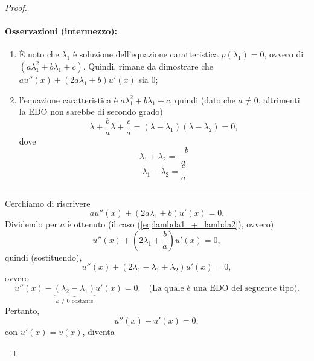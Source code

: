 \begin{proof}
\begin{enumerate}
		\paragraph{Osservazioni (intermezzo):}
		\begin{enumerate}
			\item È noto che $\lambda_1$ è soluzione dell'equazione caratteristica $p(\lambda_1)=0$, ovvero di $(a\lambda_1^2+b\lambda_1 +c)$. Quindi, rimane da dimostrare che $a u''(x)+(2a\lambda_1 + b)u'(x)$ sia 0;
			\item l'equazione caratteristica è $a\lambda_1^2+b\lambda_1 +c$, quindi (dato che $a\neq0$, altrimenti la EDO non sarebbe di secondo grado)
			\begin{equation*}
				\lambda + \frac{b}{a} \lambda + \frac{c}{a}= (\lambda - \lambda_1)(\lambda - \lambda_2) = 0,
			\end{equation*}
			dove
			\begin{equation}\label{eq:lambda1_+_lambda2}
				\lambda_1 + \lambda_2 = \frac{-b}{a}
			\end{equation}
			\begin{equation*}
				\lambda_1 - \lambda_2 = \frac{c}{a}
			\end{equation*}
		\end{enumerate}
		\hrule\vspace{2px}
		Cerchiamo di riscrivere
		\begin{equation*}
			a u''(x)+(2a\lambda_1 + b)u'(x)=0.
		\end{equation*}
		Dividendo per $a$ è ottenuto (il caso (\ref{eq:lambda1_+_lambda2}), ovvero)
		\begin{equation*}
			u''(x)+\left(2\lambda_1+\frac{b}{a}\right)u'(x)=0,
		\end{equation*}
		quindi (sostituendo),
		\begin{equation*}
			u''(x) + (2\lambda_1 -\lambda_1+\lambda_2) u'(x) = 0,
		\end{equation*}
		ovvero
		\begin{equation*}
			u''(x) - \underbrace{(\lambda_2-\lambda_1)}_{k\neq 0\text{ costante}} u'(x) = 0.\quad\text{(La quale è una EDO del seguente tipo)}.
		\end{equation*}
		Pertanto,
		\begin{equation*}
			u''(x)- u'(x) = 0,
		\end{equation*}
		con $u'(x)=v(x)$, diventa
		\begin{equation}\label{eq:edo_variabili_separabili_dimostrazione_integrale_generale_edo_seecondo_grado}

\end{equation}
\end{enumerate}
\end{proof}
